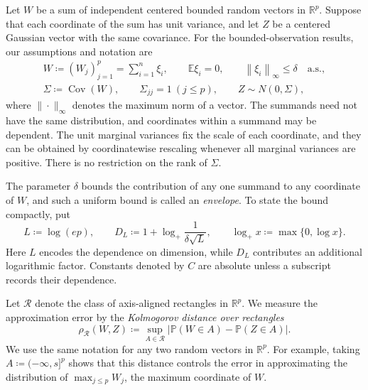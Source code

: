 \documentclass[11pt,letterpaper]{article}
\theoremstyle{remark}
\newcommand{\E}{\mathbb E}
\newcommand{\Pp}{\mathbb P}
\newcommand{\R}{\mathbb R}
\newcommand{\Cov}{\operatorname{Cov}}
\newcommand{\norm}[1]{\left\lVert#1\right\rVert}
\newcommand{\rh}{\rho_{\mathcal R}}
\begin{document}
Let \(W\) be a sum of independent centered bounded random vectors in
\(\R^p\). Suppose that each coordinate of the sum has unit variance,
and let \(Z\) be a centered Gaussian vector with the same covariance.
For the bounded-observation results, our assumptions and notation are
\begin{equation}
 \begin{gathered}
 W\coloneqq (W_j)_{j=1}^p=\sum_{i=1}^n\xi_i,\qquad
 \E\xi_i=0,\qquad \norm{\xi_i}_\infty\le\delta\quad\text{a.s.},\\
 \Sigma\coloneqq \Cov(W),\qquad\Sigma_{jj}=1\ (j\le p),
 \qquad Z\sim N(0,\Sigma),
 \end{gathered}
 \label{eq:setup}
\end{equation}
where $\|\cdot\|_\infty$ denotes the maximum norm of a vector. 
The summands need not have the same distribution, and coordinates within
a summand may be dependent. The unit marginal variances fix the scale
of each coordinate, and they can be obtained by coordinatewise rescaling
whenever all marginal variances are positive. There is no
restriction on the rank of \(\Sigma\).

The parameter \(\delta\) bounds the contribution of any one summand
to any coordinate of \(W\), and such a uniform bound is called an
\emph{envelope}. To state the
bound compactly, put
\[
 L\coloneqq \log(ep),\qquad
 D_L\coloneqq 1+\log_+\frac1{\delta\sqrt L},\qquad
 \log_+x\coloneqq \max\{0,\log x\}.
\]
Here \(L\) encodes the dependence on dimension, while \(D_L\)
contributes an additional logarithmic factor. Constants denoted by
\(C\) are absolute unless a subscript records their dependence.

Let \(\mathcal R\) denote the class of axis-aligned rectangles in
\(\R^p\). We measure the approximation error by the \emph{Kolmogorov distance over rectangles}
\[
 \rh(W,Z)\coloneqq \sup_{A\in\mathcal R}
       |\Pp(W\in A)-\Pp(Z\in A)|.
\]
We use the same notation for any two random vectors in \(\R^p\). For
example, taking \(A\coloneqq (-\infty,s]^p\) shows that this distance controls the
error in approximating the distribution of \(\max_{j\le p}W_j\), the maximum
coordinate of \(W\).
\end{document}
